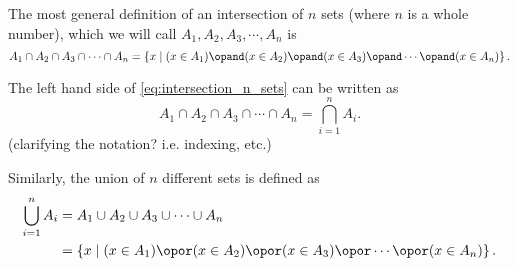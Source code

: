 The most general definition of an intersection of $n$ sets (where $n$ is a whole number), which we will call $A_{1},A_{2},A_{3},\cdots,A_{n}$ is
\begin{equation}
	A_{1}\cap A_{2}\cap A_{3}\cap \cdots \cap A_{n} = \left\{ x \mid (x\in A_{1}) \opand (x\in A_{2}) \opand (x\in A_{3}) \opand \cdots \opand (x \in A_{n})\right\}.
	\label{eq:intersection_n_sets}
\end{equation}

The left hand side of \autoref{eq:intersection_n_sets} can be written as
\begin{equation}
	A_{1}\cap A_{2}\cap A_{3}\cap \cdots \cap A_{n} = \bigcap\limits_{i=1}^{n}A_{i}.
	\label{eq:intersection_n_sets_big_notation}
\end{equation}
(clarifying the notation? i.e. indexing, etc.)

Similarly, the union of $n$ different sets is defined as
\begin{align}
	\bigcup\limits_{i=1}^{n}A_{i} &= A_{1}\cup A_{2}\cup A_{3}\cup \cdots \cup A_{n}\nonumber\\
	&= \left\{ x \mid (x\in A_{1}) \opor (x\in A_{2}) \opor (x\in A_{3}) \opor \cdots \opor (x\in A_{n})\right\}.
	\label{eq:union_n_sets}
\end{align}


